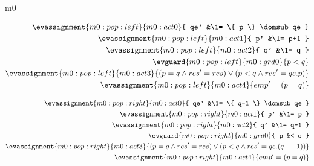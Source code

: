 \documentclass[12pt]{amsart}
\begin{document}
\begin{machine}{m0}

\begin{align*}
\evassignment{m0:pop:left}{m0:act0}{ qe' &\1= \{ p \} \domsub qe }
\\ \evassignment{m0:pop:left}{m0:act1}{ p' &\1= p+1 }
\\ \evassignment{m0:pop:left}{m0:act2}{ q' &\1= q }
\\ \evguard{m0:pop:left}{m0:grd0}{ p < q }
\\ \evassignment{m0:pop:left}{m0:act3}{ (p = q \land res' = res) \lor (p < q \land res' = qe.p) }
\\ \evassignment{m0:pop:left}{m0:act4}{ emp' = (p = q) }
\end{align*}


\begin{align*}
\evassignment{m0:pop:right}{m0:act0}{ qe' &\1= \{ q-1 \} \domsub qe }
\\ \evassignment{m0:pop:right}{m0:act1}{ p' &\1= p }
\\ \evassignment{m0:pop:right}{m0:act2}{ q' &\1= q-1 }
\\ \evguard{m0:pop:right}{m0:grd0}{ p &< q }
\\ \evassignment{m0:pop:right}{m0:act3}{ (p = q \land res' = res) \lor (p < q \land res' = qe.(q\1-1)) }
\\ \evassignment{m0:pop:right}{m0:act4}{ emp' = (p = q) }
\end{align*}



\end{machine}

\newcommand{\REQ}{\text{REQ}}
\end{document}
